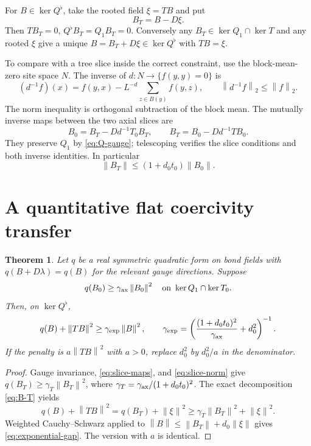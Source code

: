 \documentclass[11pt]{article}
\newtheorem{theorem}{Theorem}[section]
\theoremstyle{remark}
\newcommand{\norm}[1]{\left\|#1\right\|}
\begin{document}
For $B\in\ker Q^\flat$, take the rooted field $\xi=TB$ and put
\begin{equation}\label{eq:B-T}
 B_T=B-D\xi.
\end{equation}
Then $TB_T=0$, $Q^\flat B_T=Q_1B_T=0$. Conversely any
$B_T\in\ker Q_1\cap\ker T$ and any rooted $\xi$ give a unique
$B=B_T+D\xi\in\ker Q^\flat$ with $TB=\xi$.

To compare with a tree slice inside the correct constraint, use the
block-mean-zero site space $N$. The inverse of $d:N\to\{f(y,y)=0\}$ is
\[
 (d^{-1}f)(x)=f(y,x)-L^{-d}\sum_{z\in B(y)}f(y,z),
 \qquad \norm{d^{-1}f}_2\le\norm f_2.
\]
The norm inequality is orthogonal subtraction of the block mean.
The mutually inverse maps between the two axial slices are
\begin{equation}\label{eq:slice-maps}
 B_0=B_T-Dd^{-1}T_0B_T,\qquad
 B_T=B_0-Dd^{-1}TB_0.
\end{equation}
They preserve $Q_1$ by \eqref{eq:Q-gauge}; telescoping verifies
the slice conditions and both inverse identities. In particular
\begin{equation}\label{eq:slice-norm}
 \norm{B_T}\le(1+d_0t_0)\norm{B_0}.
\end{equation}

\section{A quantitative flat coercivity transfer}

\begin{theorem}\label{thm:gauge-gap}
Let $q$ be a real symmetric quadratic form on bond fields with
$q(B+D\lambda)=q(B)$ for the relevant gauge directions. Suppose
\[
 q(B_0)\ge\gamma_{\rm ax}\norm{B_0}^2
 \quad\hbox{on }\ker Q_1\cap\ker T_0.
\]
Then, on $\ker Q^\flat$,
\begin{equation}\label{eq:exponential-gap}
 q(B)+\norm{TB}^2\ge\gamma_{\rm exp}\norm B^2,
 \qquad
 \gamma_{\rm exp}=
 \left(\frac{(1+d_0t_0)^2}{\gamma_{\rm ax}}+d_0^2\right)^{-1}.
\end{equation}
If the penalty is $a\norm{TB}^2$ with $a>0$, replace $d_0^2$
by $d_0^2/a$ in the denominator.
\end{theorem}

\begin{proof}
Gauge invariance, \eqref{eq:slice-maps}, and
\eqref{eq:slice-norm} give
$q(B_T)\ge\gamma_T\norm{B_T}^2$, where
$\gamma_T=\gamma_{\rm ax}/(1+d_0t_0)^2$.
The exact decomposition \eqref{eq:B-T} yields
\[
 q(B)+\norm{TB}^2=q(B_T)+\norm\xi^2
 \ge\gamma_T\norm{B_T}^2+\norm\xi^2.
\]
Weighted Cauchy--Schwarz applied to
$\norm B\le\norm{B_T}+d_0\norm\xi$ gives
\eqref{eq:exponential-gap}. The version with $a$ is identical.
\end{proof}
\end{document}
